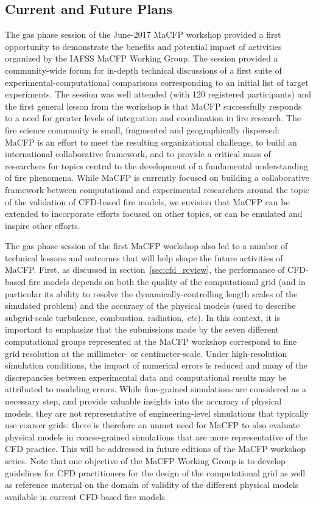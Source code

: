 
\subsection{Current and Future Plans} \label{sec:plans}

The gas phase session of the June-2017 MaCFP workshop provided a first opportunity to demonstrate the benefits and potential impact of activities organized by the IAFSS MaCFP Working Group. The session provided a community-wide forum for in-depth technical discussions of a first suite of experimental-computational comparisons corresponding to an initial list of target experiments. The session was well attended (with 120 registered participants) and the first general lesson from the workshop is that MaCFP successfully responds to a need for greater levels of integration and coordination in fire research. The fire science community is small, fragmented and geographically dispersed: MaCFP is an effort to meet the resulting organizational challenge, to build an international collaborative framework, and to provide a critical mass of researchers for topics central to the development of a fundamental understanding of fire phenomena. While MaCFP is currently focused on building a collaborative framework between computational and experimental researchers around the topic of the validation of CFD-based fire models, we envision that MaCFP can be extended to incorporate efforts focused on other topics, or can be emulated and inspire other efforts.

The gas phase session of the first MaCFP workshop also led to a number of technical lessons and outcomes that will help shape the future activities of MaCFP. First, as discussed in section~\ref{sec:cfd_review}, the performance of CFD-based fire models depends on both the quality of the computational grid (and in particular its ability to resolve the dynamically-controlling length scales of the simulated problem) and the accuracy of the physical models (used to describe subgrid-scale turbulence, combustion, radiation, {\it etc}). In this context, it is important to emphasize that the submissions made by the seven different computational groups represented at the MaCFP workshop correspond to fine grid resolution at the millimeter- or centimeter-scale. Under high-resolution simulation conditions, the impact of numerical errors is reduced and many of the discrepancies between experimental data and computational results may be attributed to modeling errors. While fine-grained simulations are considered as a necessary step, and provide valuable insights into the accuracy of physical models, they are not representative of engineering-level simulations that typically use coarser grids: there is therefore an unmet need for MaCFP to also evaluate physical models in coarse-grained simulations that are more representative of the CFD practice. This will be addressed in future editions of the MaCFP workshop series. Note that one objective of the MaCFP Working Group is to develop guidelines for CFD practitioners for the design of the computational grid as well as reference material on the domain of validity of the different physical models available in current CFD-based fire models.

